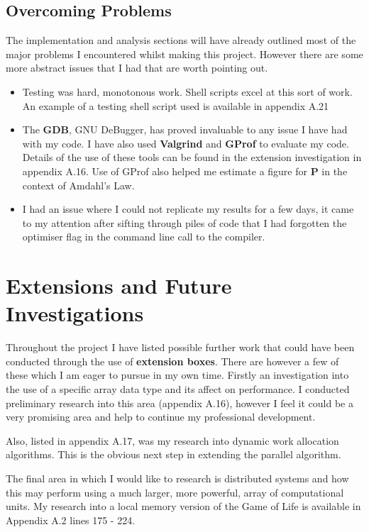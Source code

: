 \documentclass[11pt]{article} %
\begin{document}
\subsection*{Overcoming Problems}
The implementation and analysis sections will have already outlined most of the major problems I encountered whilst making this project. However there are some more abstract issues that I had that are worth pointing out. 
\begin{itemize}
\item Testing was hard, monotonous work. Shell scripts excel at this sort of work. An example of a testing shell script used is available in appendix A.21
\item The {\bf GDB}, GNU DeBugger, has proved invaluable to any issue I have had with my code. I have also used {\bf Valgrind} and {\bf GProf} to evaluate my code. Details of the use of these tools can be found in the extension investigation in appendix A.16. Use of GProf also helped me estimate a figure for {\bf P} in the context of Amdahl's Law.
\item I had an issue where I could not replicate my results for a few days, it came to my attention after sifting through piles of code that I had forgotten the optimiser flag in the command line call to the compiler.
\end{itemize}


\section*{Extensions and Future Investigations}
Throughout the project I have listed possible further work that could have been conducted through the use of {\bf extension boxes}. There are however a few of these which I am eager to pursue in my own time. Firstly an investigation into the use of a specific array data type and its affect on performance. I conducted preliminary research into this area (appendix A.16), however I feel it could be a very promising area and help to continue my professional development.

Also, listed in appendix A.17, was my research into dynamic work allocation algorithms. This is the obvious next step in extending the parallel algorithm. 

The final area in which I would like to research is distributed systems and how this may perform using a much larger, more powerful, array of computational units. My research into a local memory version of the Game of Life is available in Appendix A.2 lines 175 - 224.
\end{document}
